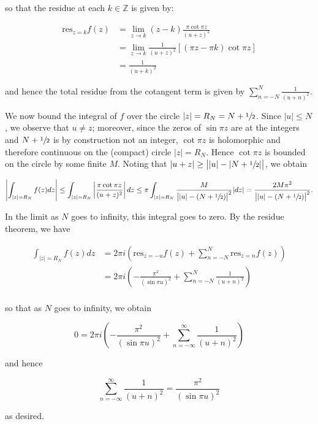 \begin{solution}
  so that the residue at each $k \in \mathbb{Z}$ is given by:

  \begin{align*}
    \text{res}_{z = k} f(z) &= \lim\limits_{z \to k} (z - k) \frac{\pi \cot{\pi z}}{(u + z)^2} \\
                            &= \lim\limits_{z \to k} \frac{1}{(u + z)^2} \left[(\pi z - \pi k) \cot{\pi z} \right] \\
                            &= \frac{1}{(u + k)^2}
  \end{align*}

  and hence the total residue from the cotangent term is given by $\sum_{n = -N}^{N} \frac{1}{(u + n)^2}$.

  We now bound the integral of $f$ over the circle $|z| = R_N = N + \sfrac{1}{2}$. Since $|u| \le N$, we observe 
  that $u \neq z$; moreover, since the zeros of $\sin{\pi z}$ are at the integers and $N + \sfrac{1}{2}$ is by 
  construction not an integer, $\cot{\pi z}$ is holomorphic and therefore continuous on the (compact) circle 
  $|z| = R_N$. Hence $\cot{\pi z}$ is bounded on the circle by some finite $M$. Noting that 
  $|u + z| \ge \big||u| - |N + \sfrac{1}{2}|\big|$, we obtain

  $$
  \left| \int_{|z| = R_N} f(z) dz \right| 
    \le \int_{|z| = R_N} \left| \frac{\pi \cot{\pi z}}{(u + z)^2} \right| dz
    \le \pi \int_{|z| = R_N} \frac{M}{\big||u| - (N + \sfrac{1}{2})\big|^2} |dz|
    = \frac{2 M \pi^2}{\big||u| - (N + \sfrac{1}{2})\big|^2}.
  $$

  In the limit as $N$ goes to infinity, this integral goes to zero. By the residue theorem, we have

  \begin{align*}
  \int_{|z| = R_N} f(z) dz &= 2 \pi i \left( \text{res}_{z = -u} f(z) + \sum_{n = -N}^{N} \text{res}_{z = n} f(z) \right) \\
                           &= 2 \pi i \left( -\frac{\pi^2}{(\sin{\pi u})^2} + \sum_{n = -N}^{N} \frac{1}{(u + n)^2} \right) \\ 
  \end{align*}

  so that as $N$ goes to infinity, we obtain

  $$
    0 = 2 \pi i \left( -\frac{\pi^2}{(\sin{\pi u})^2} + \sum_{n = -\infty}^{\infty} \frac{1}{(u + n)^2} \right)
  $$

  and hence

  $$
    \sum_{n = -\infty}^{\infty} \frac{1}{(u + n)^2} = \frac{\pi^2}{(\sin{\pi u})^2}
  $$

  as desired.
  \ \\
\end{solution}